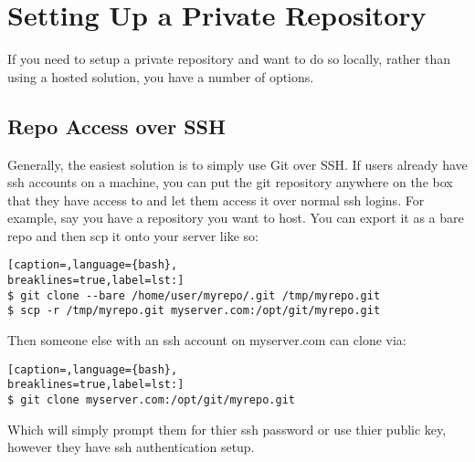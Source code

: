 \section{Setting Up a Private Repository}
If you need to setup a private repository and want to do so locally, rather
than using a hosted solution, you have a number of options.

\subsection{Repo Access over SSH}
Generally, the easiest solution is to simply use Git over SSH. If users already
have ssh accounts on a machine, you can put the git repository anywhere on the
box that they have access to and let them access it over normal ssh logins. For
example, say you have a repository you want to host. You can export it as a
bare repo and then scp it onto your server like so:
\lstset{basicstyle=\scriptsize, numbers=none, captionpos=b, tabsize=4}
\begin{lstlisting}[caption=,language={bash},
breaklines=true,label=lst:]
$ git clone --bare /home/user/myrepo/.git /tmp/myrepo.git
$ scp -r /tmp/myrepo.git myserver.com:/opt/git/myrepo.git
\end{lstlisting}

Then someone else with an ssh account on myserver.com can clone via:
\lstset{basicstyle=\scriptsize, numbers=none, captionpos=b, tabsize=4}
\begin{lstlisting}[caption=,language={bash},
breaklines=true,label=lst:]
$ git clone myserver.com:/opt/git/myrepo.git
\end{lstlisting}

Which will simply prompt them for thier ssh password or use thier public key,
however they have ssh authentication setup.
